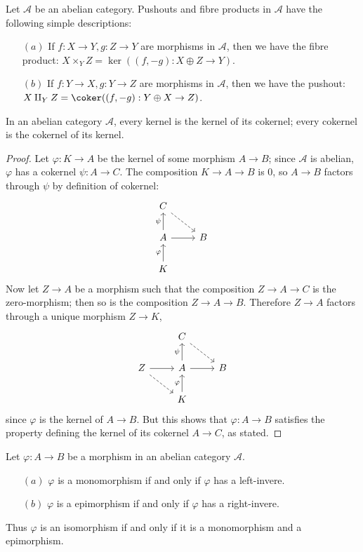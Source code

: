\begin{example}
Let $\mathcal{A}$ be an abelian category. Pushouts and fibre products in $\mathcal{A}$ have the following simple descriptions:
\begin{itemize}
\item[$(a)$] If $f:X\to Y,g:Z\to Y$ are morphisms in $\mathcal{A}$, then we have the fibre product: $X\times_YZ=\ker((f,-g):X\oplus Z\to Y)$.
\item[$(b)$] If $f:Y\to X,g:Y\to Z$ are morphisms in $\mathcal{A}$, then we have the pushout: $X\amalg_YZ=\coker((f,-g):Y\oplus X\to Z)$.
\end{itemize}
\end{example}
\begin{lemma}\label{ker is ker of coker}
In an abelian category $\mathcal{A}$, every kernel is the kernel of its cokernel; every cokernel is the cokernel of its kernel.
\end{lemma}
\begin{proof}
Let $\varphi:K\to A$ be the kernel of some morphism $A\to B$; since $\mathcal{A}$ is abelian, $\varphi$ has a cokernel $\psi:A\to C$. The composition $K\to A\to B$ is $0$, so $A\to B$ factors
through $\psi$ by definition of cokernel:
\[\begin{tikzcd}
C\ar[rd,dashed]&\\
A\ar[r]\ar[u,"\psi"]&B\\
K\ar[u,"\varphi"]&
\end{tikzcd}\]
Now let $Z\to A$ be a morphism such that the composition $Z\to A\to C$ is the zero-morphism; then so is the composition $Z\to A\to B$. Therefore $Z\to A$ factors through a unique morphism $Z\to K$,
\[\begin{tikzcd}
&C\ar[rd,dashed]&\\
Z\ar[r]\ar[rd,dashed]&A\ar[r]\ar[u,"\psi"]&B\\
&K\ar[u,"\varphi"]&
\end{tikzcd}\]
since $\varphi$ is the kernel of $A\to B$. But this shows that $\varphi:A\to B$ satisfies the property defining the kernel of its cokernel $A\to C$, as stated.
\end{proof}
\begin{proposition}\label{mono epi iff inverse}
Let $\varphi:A\to B$ be a morphism in an abelian category $\mathcal{A}$.
\begin{itemize}
\item[$(a)$] $\varphi$ is a monomorphism if and only if $\varphi$ has a left-invere.
\item[$(b)$] $\varphi$ is a epimorphism if and only if $\varphi$ has a right-invere.
\end{itemize}
Thus $\varphi$ is an isomorphism if and only if it is a monomorphism and a epimorphism.
\end{proposition}
